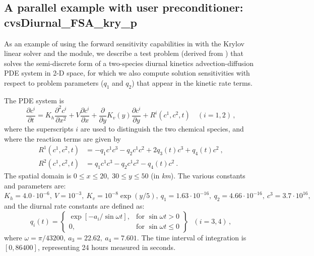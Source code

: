 


\subsection{A parallel example with user preconditioner: cvsDiurnal\_FSA\_kry\_p}
\label{ss:cvsDiurnal_FSA_kry_p}

As an example of using the forward sensitivity capabilities in {\cvodes} 
with the Krylov linear solver {\cvspgmr} and the {\nvecp} module, we describe
a test problem (derived from ) that solves the
semi-discrete form of a two-species diurnal kinetics advection-diffusion PDE 
system in 2-D space, for which we also compute solution sensitivities with respect to 
problem parameters ($q_1$ and $q_2$) that appear in the kinetic rate terms.

The PDE system is
\begin{equation}\label{e:cvsDiurnal_FSA_kry_p_PDE}
  \frac{\partial c^i}{\partial t} = K_h\frac{\partial^2 c^i}{\partial x^2}
  +V \frac{\partial c^i}{\partial x}
  + \frac{\partial} {\partial y} K_v(y) \frac{\partial c^i}{\partial y}
  + R^i(c^1,c^2,t) \quad (i=1,2) \, ,
\end{equation}
where the superscripts $i$ are used to distinguish the two chemical
species, and where the reaction terms are given by
\begin{equation}\label{e:cvsDiurnal_FSA_kry_p_R}
  \begin{split}
    R^1(c^1,c^2,t) & = -q_1c^1c^3-q_2c^1c^2+2q_3(t)c^3+q_4(t)c^2 ~, \\
    R^2(c^1,c^2,t) & = q_1c^1c^3-q_2c^1c^2-q_4(t)c^2 ~.
  \end{split}
\end{equation}
The spatial domain is $0 \leq x \leq 20,\;30 \leq y \leq 50$ (in {\em km}). 
The various constants and parameters are: $K_h=4.0\cdot 10^{-6},
~ V=10^{-3},~ K_v=10^{-8}\exp (y/5),~ q_1=1.63\cdot 10^{-16},
~ q_2=4.66\cdot 10^{-16},~ c^3=3.7\cdot 10^{16},$ and the diurnal
rate constants are defined as:
\begin{equation*}
  q_i(t) = 
  \left\{ \begin{array}{ll}
      \exp [-a_i/\sin \omega t], & \mbox{for } \sin \omega t>0 \\
      0, & \mbox{for } \sin \omega t\leq 0
    \end{array} \right\} ~~~(i=3,4) \, ,
\end{equation*}
where $\omega =\pi /43200, ~ a_3=22.62,~ a_4=7.601.$  The time interval of
integration is $[0, 86400]$, representing 24 hours measured in seconds.

